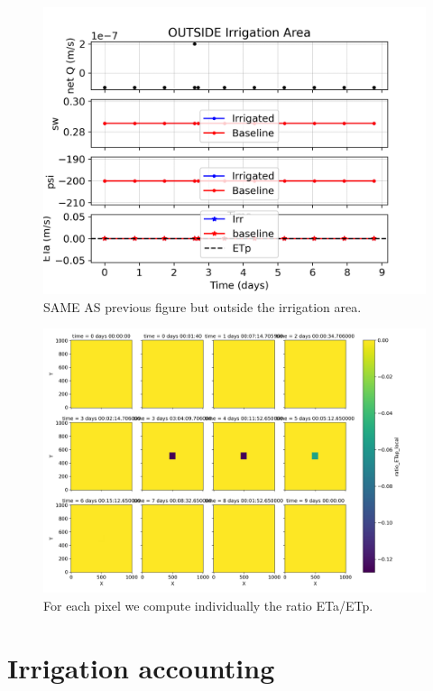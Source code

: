\documentclass{article}
\begin{document}
\begin{figure}[!htbp]
\centering
\includegraphics[width=0.875\linewidth]{files/plot_1d_evol_outArea-4651edee791016dd422d335828ba2785.png}
\caption*{SAME AS previous figure but outside the irrigation area.}
\end{figure}

\begin{figure}[!htbp]
\centering
\includegraphics[width=0.875\linewidth]{files/ratioETap_withIRR_sp-49b67c2d818160e410a8535fe06acdc9.png}
\caption*{For each pixel we compute individually the ratio ETa/ETp.}
\end{figure}

\section{Irrigation accounting}
\end{document}
